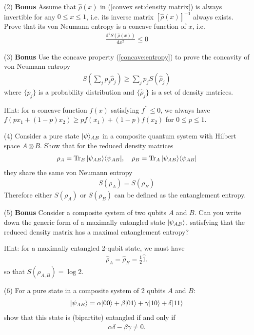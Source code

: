 (2) \textbf{ Bonus} Assume that $\hat\rho(x)$ in (\ref{convex set:density matrix}) is always invertible for any $0\leq x\leq1$, i.e. its inverse matrix $[\hat\rho(x)]^{-1}$ always exists. Prove that its von Neumann entropy is a concave function of $x$, i.e.
\begin{align}\label{concave:entropy}
\frac{\text{d}^2S(\hat\rho(x))}{\text{d}x^2}\leq0
\end{align}

(3) \textbf{ Bonus} Use the concave property (\ref{concave:entropy}) to prove the concavity of von Neumann entropy
\begin{align}
S(\sum_jp_j\hat\rho_j)\geq\sum_jp_jS(\hat\rho_j)
\end{align}
where $\{p_j\}$ is a probability distribution and $\{\hat\rho_j\}$ is a set of density matrices. 

Hint: for a concave function $f(x)$ satisfying $f^{\prime\prime}\leq0$, we always have $f(px_1+(1-p)x_2)\geq pf(x_1)+(1-p)f(x_2)$ for $0\leq p\leq 1$.

(4) Consider a pure state $|{\psi}\rangle_{AB}$ in a composite quantum system with Hilbert space $A\otimes B$. Show that for the reduced density matrices 
\begin{align}
\rho_A=\operatorname{Tr}_B|{\psi_{AB}}\rangle\langle{\psi_{AB}}|,~~~\rho_B=\operatorname{Tr}_A|{\psi_{AB}}\rangle\langle{\psi_{AB}}|
\end{align}
they share the same von Neumann entropy
\begin{align}
S(\rho_A)=S(\rho_B)
\end{align}
Therefore either $S(\rho_A)$ or $S(\rho_B)$ can be defined as the entanglement entropy. 

(5) \textbf{Bonus} Consider a composite system of two qubits $A$ and $B$. Can you write down the generic form of a maximally entangled state $|{\psi_{AB}}\rangle$, satisfying that the reduced density matrix has a maximal entanglement entropy?

Hint: for a maximally entangled 2-qubit state, we must have
\begin{align}
\hat\rho_A=\hat\rho_B=\frac12\hat1.
\end{align}
so that $S(\rho_{A,B})=\log2$. 


(6) For a pure state in a composite system of 2 qubits $A$ and $B$:
\begin{align}
|{\psi_{AB}}\rangle=\alpha|{00}\rangle+\beta|{01}\rangle+\gamma|{10}\rangle+\delta|{11}\rangle
\end{align}
show that this state is (bipartite) entangled if and only if 
\begin{align}
\alpha\delta-\beta\gamma\neq0.
\end{align}

